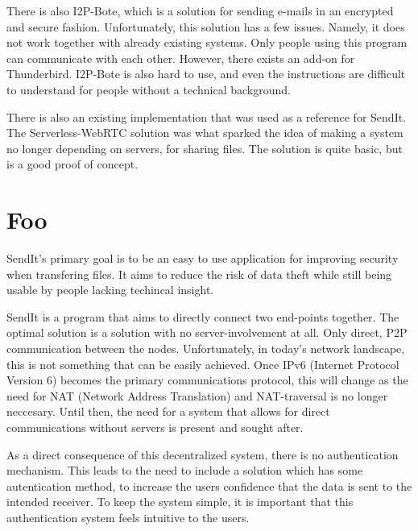 \documentclass[runningheads]{llncs}
\begin{document}
There is also I2P-Bote, which is a solution for sending e-mails in an encrypted and secure fashion. Unfortunately, this solution has a few issues. Namely, it does not work together with already existing systems. Only people using this program can communicate with each other. However, there exists an add-on for Thunderbird. I2P-Bote is also hard to use, and even the instructions are difficult to understand for people without a technical background.\cite{url_I2PBote,url_I2PInfo}

There is also an existing implementation that was used as a reference for SendIt. The Serverless-WebRTC solution \cite{url_webrtc_ex} was what sparked the idea of making a system no longer depending on servers, for sharing files. The solution is quite basic, but is a good proof of concept.
%
\section{Foo}
\label{sec:}

SendIt's primary goal is to be an easy to use application for improving security when transfering files. It aims to reduce the risk of data theft while still being usable by people lacking techincal insight.

SendIt is a program that aims to directly connect two end-points together. The optimal solution is a solution with no server-involvement at all. Only direct, P2P communication between the nodes. Unfortunately, in today's network landscape, this is not something that can be easily achieved. Once IPv6 (Internet Protocol Version 6) becomes the primary communications protocol, this will change as the need for NAT (Network Address Translation) and NAT-traversal is no longer neccesary. Until then, the need for a system that allows for direct communications without servers is present and sought after.

As a direct consequence of this decentralized system, there is no authentication mechanism. This leads to the need to include a solution which has some autentication method, to increase the users confidence that the data is sent to the intended receiver. To keep the system simple, it is important that this authentication system feels intuitive to the users.



\end{document}
